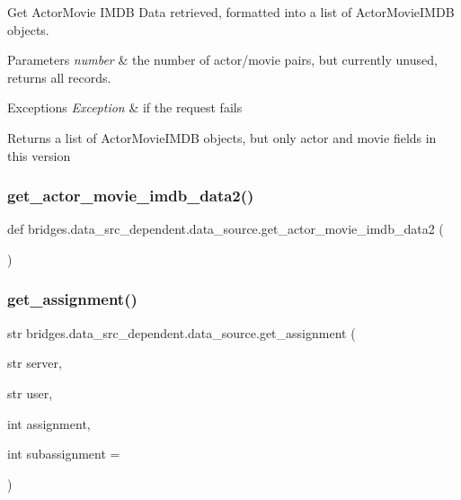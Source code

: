 Get Actor\+Movie I\+M\+DB Data retrieved, formatted into a list of Actor\+Movie\+I\+M\+DB objects. 


\begin{DoxyParams}{Parameters}
{\em number} & the number of actor/movie pairs, but currently unused, returns all records. \\
\hline
\end{DoxyParams}

\begin{DoxyExceptions}{Exceptions}
{\em Exception} & if the request fails\\
\hline
\end{DoxyExceptions}
\begin{DoxyReturn}{Returns}
a list of Actor\+Movie\+I\+M\+DB objects, but only actor and movie fields in this version 
\end{DoxyReturn}
\mbox{\label{namespacebridges_1_1data__src__dependent_1_1data__source_a279aa1a757f4838f3d048651cb1a7d26}} 
\subsubsection{\texorpdfstring{get\_actor\_movie\_imdb\_data2()}{get\_actor\_movie\_imdb\_data2()}}
{\footnotesize\ttfamily def bridges.\+data\+\_\+src\+\_\+dependent.\+data\+\_\+source.\+get\+\_\+actor\+\_\+movie\+\_\+imdb\+\_\+data2 (\begin{DoxyParamCaption}{ }\end{DoxyParamCaption})}

\mbox{\label{namespacebridges_1_1data__src__dependent_1_1data__source_ada4137e0574e7f4875f83cf4afdc74d5}} 
\subsubsection{\texorpdfstring{get\_assignment()}{get\_assignment()}}
{\footnotesize\ttfamily  str bridges.\+data\+\_\+src\+\_\+dependent.\+data\+\_\+source.\+get\+\_\+assignment (\begin{DoxyParamCaption}\item[{str}]{server,  }\item[{str}]{user,  }\item[{int}]{assignment,  }\item[{int }]{subassignment = {} }\end{DoxyParamCaption})}



